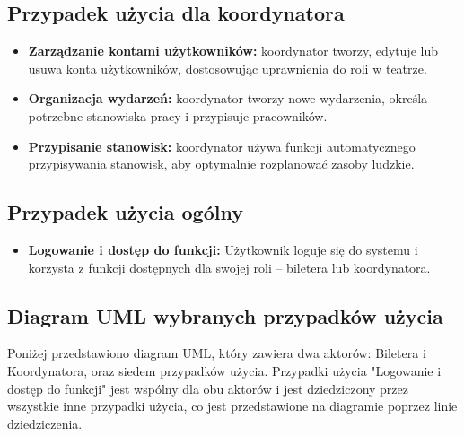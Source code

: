 \documentclass[shortabstract]{iithesis}
\begin{document}
\subsection{Przypadek użycia dla koordynatora}

\begin{itemize}
  \item \textbf{Zarządzanie kontami użytkowników:} koordynator tworzy, edytuje lub usuwa konta użytkowników, dostosowując uprawnienia do roli w teatrze.
  \item \textbf{Organizacja wydarzeń:} koordynator tworzy nowe wydarzenia, określa potrzebne stanowiska pracy i przypisuje pracowników.
  \item \textbf{Przypisanie stanowisk:} koordynator używa funkcji automatycznego przypisywania stanowisk, aby optymalnie rozplanować zasoby ludzkie.
\end{itemize}

\subsection{Przypadek użycia ogólny}

\begin{itemize}
  \item \textbf{Logowanie i dostęp do funkcji:} Użytkownik loguje się do systemu i korzysta z funkcji dostępnych dla swojej roli – biletera lub koordynatora.
\end{itemize}

\subsection{Diagram UML wybranych przypadków użycia}

Poniżej przedstawiono diagram UML, który zawiera dwa aktorów: Biletera i Koordynatora, oraz siedem przypadków użycia. Przypadki użycia "Logowanie i dostęp do funkcji" jest wspólny dla obu aktorów i jest dziedziczony przez wszystkie inne przypadki użycia, co jest przedstawione na diagramie poprzez linie dziedziczenia.
\end{document}
